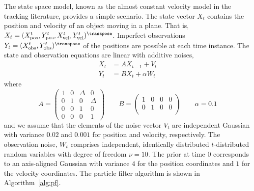The state space model, known as the almost constant velocity model in the
tracking literature, provides a simple scenario. The state vector $X_t$
contains the position and velocity of an object moving in a plane. That is,
$X_t = (\xpos^t, \ypos^t, \xvel^t, \yvel^t)^{\transpose}$. Imperfect
observations $Y_t = (\xobs^t, \yobs^t)^{\transpose}$ of the positions are
possible at each time instance. The state and observation equations are linear
with additive noises,
\begin{align*}
  X_t &= AX_{t-1} + V_t \\
  Y_t &= BX_t + \alpha W_t
\end{align*}
where
\begin{equation*}
  A = \begin{pmatrix}
    1 & 0 & \Delta & 0      \\
    0 & 1 & 0      & \Delta \\
    0 & 0 & 1      & 0      \\
    0 & 0 & 0      & 1
  \end{pmatrix} \qquad
  B = \begin{pmatrix}
    1 & 0 & 0 & 0 \\
    0 & 1 & 0 & 0 \\
  \end{pmatrix} \qquad
  \alpha = 0.1
\end{equation*}
and we assume that the elements of the noise vector $V_t$ are independent
Gaussian with variance $0.02$ and $0.001$ for position and velocity,
respectively. The observation noise, $W_t$ comprises independent, identically
distributed $t$-distributed random variables with degree of freedom $\nu = 10$.
The prior at time $0$ corresponds to an axis-aligned Gaussian with variance $4$
for the position coordinates and $1$ for the velocity coordinates. The particle
filter algorithm is shown in Algorithm~\ref{alg:pf}.

